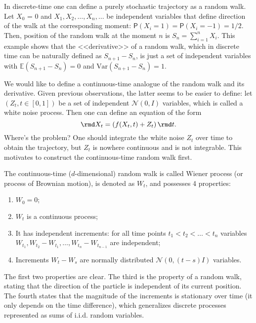 In discrete-time one can define a purely stochastic trajectory as a random walk. Let $X_0$ = 0 and $X_1, X_2, \ldots, X_n, \ldots$ be independent variables that define direction of the walk at the corresponding moment: $\mathsf{P}(X_i = 1) = \mathsf{P}(X_i = -1) = 1/2$. Then, position of the random walk at the moment $n$ is $S_n = \sum_{i = 1}^{n} X_i$. This example shows that the <<derivative>> of a random walk, which in discrete time can be naturally defined as $S_{n + 1} - S_{n}$, is just a set of independent variables with $\mathbb{E} \left(S_{n + 1} - S_{n}\right) = 0$ and $\text{Var}\left(S_{n + 1} - S_{n}\right) = 1$.

We would like to define a continuous-time analogue of the random walk and its derivative. Given previous observations, the latter seems to be easier to define: let $(Z_t, t \in [0, 1])$ be a set of independent $\mathcal{N}(0, I)$ variables, which is called a white noise process. Then one can define an equation of the form
\[
    \rmd X_t = \left(f(X_t, t) + Z_t\right)\rmd t.
\]
Where's the problem? One should integrate the white noise $Z_t$ over time to obtain the trajectory, but $Z_t$ is nowhere continuous and is not integrable. This motivates to construct the continuous-time random walk first.

\begin{definition}
The continuous-time ($d$-dimensional) random walk is called Wiener process (or process of Brownian motion), is denoted as $W_t$, and possesses 4 properties:

\begin{enumerate}
    \item $W_0 = 0$;
    \item $W_t$ is a continuous process;
    \item It has independent increments: for all time points $t_1 < t_2 < \ldots < t_n$ variables $W_{t_1}, W_{t_2} - W_{t_1}, \ldots, W_{t_n} - W_{t_{n - 1}}$ are independent;
    \item Increments $W_t - W_s$ are normally distributed $\mathcal{N}(0, (t - s) I)$ variables.
\end{enumerate}
\end{definition}

The first two properties are clear. The third is the property of a random walk, stating that the direction of the particle is independent of its current position. The fourth states that the magnitude of the increments is stationary over time (it only depends on the time difference), which generalizes discrete processes represented as sums of i.i.d. random variables.

